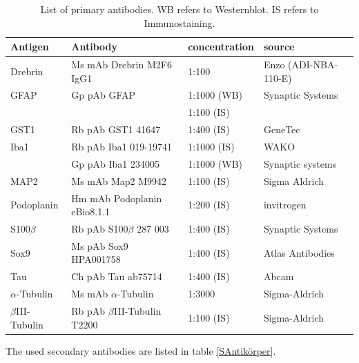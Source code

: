 \documentclass[a4paper,11pt,bibtotocnumbered]{article}
\begin{document}
\begin{table}[H]
\centering
{\captionsetup{format=hang}\caption[List of primary antibodies.]{List of primary antibodies. WB refers to Westernblot. IS refers to Immunostaining.}\label{PAntikörper}}
\renewcommand{\arraystretch}{1}
\begin{tabularx}{\textwidth}{XXp{3cm}X}
\toprule
Antigen&Antibody&concentration&source\\
\midrule
\midrule
Drebrin&Ms mAb Drebrin M2F6 IgG1	& 1:100 & Enzo (ADI-NBA-110-E)\\
\midrule
GFAP&Gp pAb GFAP&1:1000 (WB)& Synaptic Systems\\
&&1:100 (IS)&\\
\midrule
GST1&Rb pAb GST1 41647&1:400 (IS)& GeneTec\\
\midrule
Iba1&Rb pAb Iba1 019-19741&1:1000 (IS)&WAKO\\
&Gp pAb Iba1 234005&1:1000 (WB)&Synaptic systems\\
\midrule
MAP2&Ms mAb Map2 M9942&1:100 (IS)&Sigma Aldrich\\
\midrule
Podoplanin&Hm mAb Podoplanin eBio8.1.1&1:200 (IS)&invitrogen\\
\midrule
S100$\beta$ &Rb pAb S100$\beta$  287 003&1:400 (IS)&Synaptic Systems\\
\midrule
Sox9&Ms pAb Sox9 HPA001758&1:400 (IS)&Atlas Antibodies\\
\midrule
Tau&Ch pAb Tau ab75714&1:400 (IS)& Abcam\\
\midrule
$\alpha$-Tubulin&Ms mAb $\alpha$-Tubulin	 &	1:3000	&Sigma-Aldrich\\
\midrule
$\beta$III-Tubulin&Rb pAb $\beta$III-Tubulin T2200 &1:100 (IS)&Sigma-Aldrich\\
\bottomrule
\end{tabularx}
\end{table}



The used secondary antibodies are listed in table \ref{SAntikörper}.
\end{document}
